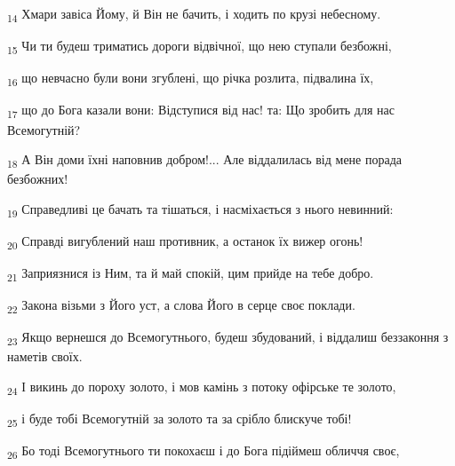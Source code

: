 \begin{tcolorbox}
\textsubscript{14} Хмари завіса Йому, й Він не бачить, і ходить по крузі небесному.
\end{tcolorbox}
\begin{tcolorbox}
\textsubscript{15} Чи ти будеш триматись дороги відвічної, що нею ступали безбожні,
\end{tcolorbox}
\begin{tcolorbox}
\textsubscript{16} що невчасно були вони згублені, що річка розлита, підвалина їх,
\end{tcolorbox}
\begin{tcolorbox}
\textsubscript{17} що до Бога казали вони: Відступися від нас! та: Що зробить для нас Всемогутній?
\end{tcolorbox}
\begin{tcolorbox}
\textsubscript{18} А Він доми їхні наповнив добром!... Але віддалилась від мене порада безбожних!
\end{tcolorbox}
\begin{tcolorbox}
\textsubscript{19} Справедливі це бачать та тішаться, і насміхається з нього невинний:
\end{tcolorbox}
\begin{tcolorbox}
\textsubscript{20} Справді вигублений наш противник, а останок їх вижер огонь!
\end{tcolorbox}
\begin{tcolorbox}
\textsubscript{21} Заприязнися із Ним, та й май спокій, цим прийде на тебе добро.
\end{tcolorbox}
\begin{tcolorbox}
\textsubscript{22} Закона візьми з Його уст, а слова Його в серце своє поклади.
\end{tcolorbox}
\begin{tcolorbox}
\textsubscript{23} Якщо вернешся до Всемогутнього, будеш збудований, і віддалиш беззаконня з наметів своїх.
\end{tcolorbox}
\begin{tcolorbox}
\textsubscript{24} І викинь до пороху золото, і мов камінь з потоку офірське те золото,
\end{tcolorbox}
\begin{tcolorbox}
\textsubscript{25} і буде тобі Всемогутній за золото та за срібло блискуче тобі!
\end{tcolorbox}
\begin{tcolorbox}
\textsubscript{26} Бо тоді Всемогутнього ти покохаєш і до Бога підіймеш обличчя своє,
\end{tcolorbox}
